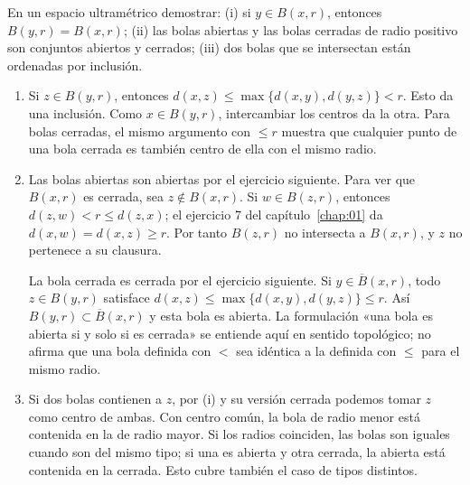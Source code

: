 \begin{ejercicio}
En un espacio ultramétrico demostrar: (i) si $y\in B(x,r)$, entonces $B(y,r)=B(x,r)$; (ii) las bolas abiertas y las bolas cerradas de radio positivo son conjuntos abiertos y cerrados; (iii) dos bolas que se intersectan están ordenadas por inclusión.
\end{ejercicio}
\begin{solucion}
\begin{enumerate}[label=(\roman*)]
\item Si $z\in B(y,r)$, entonces $d(x,z)\le\max\{d(x,y),d(y,z)\}<r$. Esto da una inclusión. Como $x\in B(y,r)$, intercambiar los centros da la otra. Para bolas cerradas, el mismo argumento con $\le r$ muestra que cualquier punto de una bola cerrada es también centro de ella con el mismo radio.
\item Las bolas abiertas son abiertas por el ejercicio siguiente. Para ver que $B(x,r)$ es cerrada, sea $z\notin B(x,r)$. Si $w\in B(z,r)$, entonces $d(z,w)<r\le d(z,x)$; el ejercicio 7 del capítulo~\ref{chap:01} da $d(x,w)=d(x,z)\ge r$. Por tanto $B(z,r)$ no intersecta a $B(x,r)$, y $z$ no pertenece a su clausura.

La bola cerrada es cerrada por el ejercicio siguiente. Si $y\in\overline B(x,r)$, todo $z\in B(y,r)$ satisface $d(x,z)\le\max\{d(x,y),d(y,z)\}\le r$. Así $B(y,r)\subset\overline B(x,r)$ y esta bola es abierta. La formulación «una bola es abierta si y solo si es cerrada» se entiende aquí en sentido topológico; no afirma que una bola definida con $<$ sea idéntica a la definida con $\le$ para el mismo radio.
\item Si dos bolas contienen a $z$, por (i) y su versión cerrada podemos tomar $z$ como centro de ambas. Con centro común, la bola de radio menor está contenida en la de radio mayor. Si los radios coinciden, las bolas son iguales cuando son del mismo tipo; si una es abierta y otra cerrada, la abierta está contenida en la cerrada. Esto cubre también el caso de tipos distintos.
\end{enumerate}
\end{solucion}

